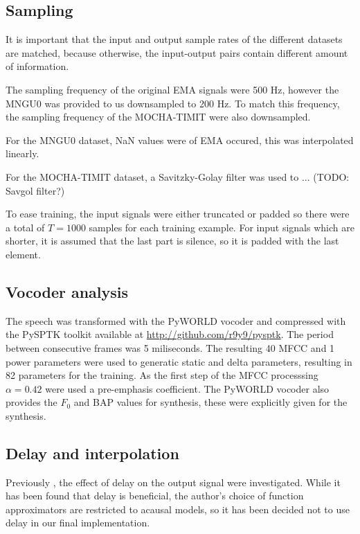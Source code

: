 \documentclass[a4paper]{article}
\begin{document}
\subsection{Sampling}

It is important that the input and output sample rates of the different
datasets are matched, because otherwise, the input-output pairs contain
different amount of information.

The sampling frequency of the original EMA signals were 500 Hz, however
the MNGU0 was provided to us downsampled to 200 Hz. To match this frequency,
the sampling frequency of the MOCHA-TIMIT were also downsampled.

For the MNGU0 dataset, NaN values were of EMA occured, this was interpolated
linearly.

For the MOCHA-TIMIT dataset, a Savitzky-Golay filter was used to ...
(TODO: Savgol filter?)

To ease training, the input signals were either truncated or padded
so there were a total of \( T = 1000 \) samples for each training example.
For input signals which are shorter, it is assumed that the last part is
silence, so it is padded with the last element.

\subsection{Vocoder analysis}

The speech was transformed with the PyWORLD vocoder \cite{Morise2016}
and compressed with the PySPTK toolkit available at \url{http://github.com/r9y9/pysptk}.
The period between consecutive frames was 5 miliseconds. The resulting 40 MFCC and 1 power parameters
were used to generatic static and delta parameters, resulting in 82 parameters
for the training. As the first step of the MFCC processsing \( \alpha
= 0.42 \) were used a pre-emphasis coefficient. The PyWORLD vocoder
also provides the $ F_0 $ and BAP values for synthesis, these were
explicitly given for the synthesis.

\subsection{Delay and interpolation}
Previously \cite{Gonzalez2016}, the effect of delay on the
output signal were investigated. While it has been found that delay
is beneficial, the author's choice of function approximators are
restricted to acausal models, so it has been decided
not to use delay in our final implementation.
\end{document}

